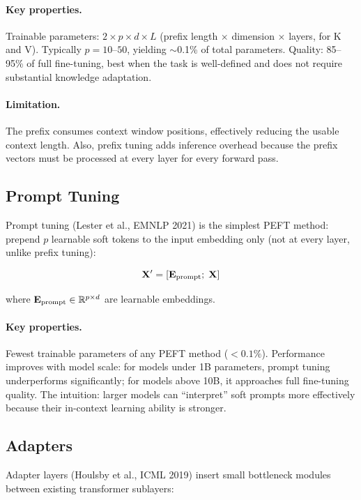 \paragraph{Key properties.}
Trainable parameters: $2 \times p \times d \times L$ (prefix length $\times$
dimension $\times$ layers, for K and V).  Typically $p = 10$--$50$, yielding
$\sim$0.1\% of total parameters.  Quality: 85--95\% of full fine-tuning, best
when the task is well-defined and does not require substantial knowledge
adaptation.

\paragraph{Limitation.}
The prefix consumes context window positions, effectively reducing the usable
context length.  Also, prefix tuning adds inference overhead because the
prefix vectors must be processed at every layer for every forward pass.

\subsection{Prompt Tuning}
\label{sec:prompt-tuning}

Prompt tuning (Lester et al., EMNLP 2021) is the simplest PEFT method:
prepend $p$ learnable soft tokens to the input embedding only (not at every
layer, unlike prefix tuning):

\[
    \mathbf{X}' = [\mathbf{E}_{\text{prompt}};\; \mathbf{X}]
\]

where $\mathbf{E}_{\text{prompt}} \in \mathbb{R}^{p \times d}$ are learnable embeddings.

\paragraph{Key properties.}
Fewest trainable parameters of any PEFT method ($< 0.1\%$).  Performance
improves with model scale: for models under 1B parameters, prompt tuning
underperforms significantly; for models above 10B, it approaches full
fine-tuning quality.  The intuition: larger models can ``interpret'' soft
prompts more effectively because their in-context learning ability is
stronger.

\subsection{Adapters}
\label{sec:adapters}

Adapter layers (Houlsby et al., ICML 2019) insert small bottleneck modules
between existing transformer sublayers:

